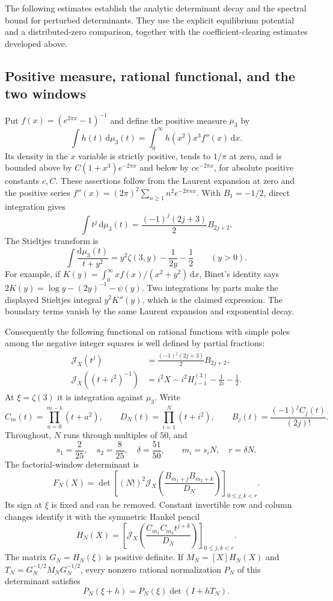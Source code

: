 \documentclass[11pt]{article}
\theoremstyle{definition}\newtheorem{definition}[theorem]{Definition}
\theoremstyle{remark}\newtheorem{remark}[theorem]{Remark}
\begin{document}
The following estimates establish the analytic determinant decay and the spectral bound for perturbed determinants. They use the explicit equilibrium potential and a distributed-zero comparison, together with the coefficient-clearing estimates developed above.

\subsection{Positive measure, rational functional, and the two windows}

Put $f(x)=(e^{2\pi x}-1)^{-1}$ and define the positive measure $\mu_3$ by
\[
 \int h(t)\,\mathrm d\mu_3(t)
 =\int_0^\infty h(x^2)x^3f''(x)\,\mathrm dx.
\]
Its density in the $x$ variable is strictly positive, tends to $1/\pi$ at
zero, and is bounded above by $C(1+x^3)e^{-2\pi x}$ and below by
$c e^{-2\pi x}$, for absolute positive constants $c,C$.  These assertions
follow from the Laurent expansion at zero and the positive series
$f''(x)=(2\pi)^2\sum_{n\ge1}n^2e^{-2\pi nx}$.
With $B_1=-1/2$, direct integration gives
\[
 \int t^j\,\mathrm d\mu_3(t)
 =\frac{(-1)^j(2j+3)}2 B_{2j+2}.
\]
The Stieltjes transform is
\[
 \int\frac{\mathrm d\mu_3(t)}{t+y^2}
 =y^2\zeta(3,y)-\frac1{2y}-\frac12\qquad(y>0).
\]
For example, if $K(y)=\int_0^\infty xf(x)/(x^2+y^2)\,\mathrm dx$,
Binet's identity says $2K(y)=\log y-(2y)^{-1}-\psi(y)$.
Two integrations by parts make the displayed Stieltjes integral
$y^2K''(y)$, which is the claimed expression.  The boundary terms vanish
by the same Laurent expansion and exponential decay.

Consequently the following functional on rational functions with simple
poles among the negative integer squares is well defined by partial fractions:
\begin{align*}
 \mathcal J_X(t^j)&=\frac{(-1)^j(2j+3)}2 B_{2j+2},\\
 \mathcal J_X((t+i^2)^{-1})
 &=i^2X-i^2H_{i-1}^{(3)}-\frac1{2i}-\frac12.
\end{align*}
At $\xi=\zeta(3)$ it is integration against $\mu_3$.
Write
\[
 C_m(t)=\prod_{a=0}^{m-1}(t+a^2),\qquad
 D_N(t)=\prod_{i=1}^N(t+i^2),\qquad
 B_j(t)=\frac{(-1)^jC_j(t)}{(2j)!}.
\]
Throughout, $N$ runs through multiples of $50$, and
\[
 s_1=\frac2{25},\quad s_2=\frac8{25},\quad
 \delta=\frac{51}{50},\qquad m_i=s_iN,\quad r=\delta N.
\]
The factorial-window determinant is
\[
 F_N(X)=\det\left[(N!)^2\mathcal J_X
       \left(\frac{B_{m_1+j}B_{m_2+k}}{D_N}\right)
       \right]_{0\le j,k<r}.
\]
Its sign at $\xi$ is fixed and can be removed.  Constant invertible row and
column changes identify it with the symmetric Hankel pencil
\[
 H_N(X)=\left[\mathcal J_X
 \left(\frac{C_{m_1}C_{m_2}t^{j+k}}{D_N}\right)
 \right]_{0\le j,k<r}.
\]
The matrix $G_N=H_N(\xi)$ is positive definite.  If $M_N=[X]H_N(X)$ and
$T_N=G_N^{-1/2}M_NG_N^{-1/2}$, every nonzero rational normalization $P_N$
of this determinant satisfies
\begin{equation}\label{z3a:ratio}
 P_N(\xi+h)=P_N(\xi)\det(I+hT_N).
\end{equation}
\end{document}

